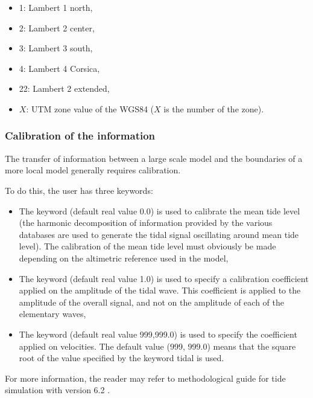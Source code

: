 \begin{itemize}
\item 1: Lambert 1 north,

\item 2: Lambert 2 center,

\item 3: Lambert 3 south,

\item 4: Lambert 4 Corsica,

\item 22: Lambert 2 extended,

\item $X$: UTM zone value of the WGS84 ($X$ is the number of the
zone).
\end{itemize}


\subsubsection{Calibration of the information}

The transfer of information between a large scale model and the boundaries of
a more local model generally requires calibration.

To do this, the user has three keywords:

\begin{itemize}
\item The keyword  (default real
value 0.0) is used to calibrate the mean tide level (the harmonic decomposition
of information provided by the various databases are used to generate the tidal
signal oscillating around mean tide level). The calibration of the mean tide
level must obviously be made depending on the altimetric reference used in the
model,

\item The keyword  (default real
value 1.0) is used to specify a calibration coefficient applied on the
amplitude of the tidal wave. This coefficient is applied to the amplitude of
the overall signal, and not on the amplitude of each of the elementary waves,

\item The keyword  (default
real value 999,999.0) is used to specify the coefficient applied on velocities.
The default value (999, 999.0) means that the square root of the value
specified by the keyword  tidal is
used.
\end{itemize}

For more information, the reader may refer to methodological guide for tide
simulation with version 6.2 \cite{Pham2012}.
